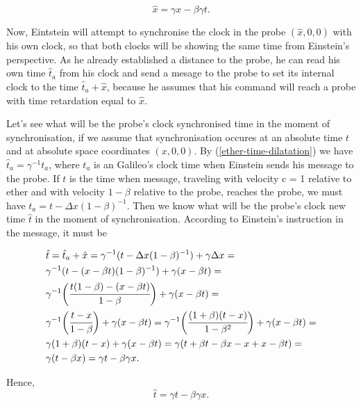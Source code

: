 \documentclass[main.tex]{subfiles}
\begin{document}
\begin{equation}
\hat{x} = \gamma x - \beta\gamma t.
\end{equation}

Now, Eintstein will attempt to synchronise the clock in the probe $(\hat{x}, 0, 0)$ with his own clock, so that both clocks will be showing the same time from Einstein's perspective. As he already established a distance to the probe, he can read his own time $\hat{t}_a$ from his clock and send a mesage to the probe to set its internal clock to the time $\hat{t}_a + \hat{x}$, because he assumes that his command will reach a probe with time retardation equal to $\hat{x}$. 

Let's see what will be the probe's clock synchronised time in the moment of synchronisation, if we assume that synchronisation occures at an absolute time $t$ and at absolute space coordinates $(x, 0, 0)$. By (\ref{ether-time-dilatation}) we have $\hat{t}_a = \gamma^{-1} t_a$, where $t_a$ is an Galileo's clock time when Einstein sends his message to the probe. If $t$ is the time when message, traveling with velocity c = 1 relative to ether and with velocity $1 - \beta$ relative to the probe, reaches the probe, we must have $t_a = t - \Delta x (1 - \beta)^{-1}$. Then we know what will be the probe's clock new time $\hat{t}$ in the moment of synchronisation. According to Einstein's instruction in the message, it must be

\begin{align*}
& \hat{t} = \hat{t}_a + \hat{x} = \gamma^{-1}(t - \Delta x (1 - \beta)^{-1}) + \gamma \Delta x = \\
& \gamma^{-1}(t - (x - \beta t) (1 - \beta)^{-1}) + \gamma (x - \beta t) = \\
& \gamma^{-1}\bigg( \cfrac{t(1 - \beta) - (x - \beta t)}{1 - \beta} \bigg) + \gamma (x - \beta t) = \\
& \gamma^{-1}\bigg( \cfrac{t - x}{1 - \beta} \bigg) + \gamma (x - \beta t) = 
\gamma^{-1}\bigg( \cfrac{(1 + \beta)(t - x)}{1 - \beta^2} \bigg) + \gamma (x - \beta t) = 
\\
& \gamma(1 + \beta)(t - x) + \gamma (x - \beta t) = \gamma(t + \beta t - \beta x - x + x -\beta t) = \\
& \gamma( t - \beta x) = \gamma t - \beta\gamma x.
\end{align*}

Hence,
\begin{equation}
\label{ether-lorentz-t}
\hat{t} = \gamma t - \beta\gamma x.
\end{equation}
\end{document}
